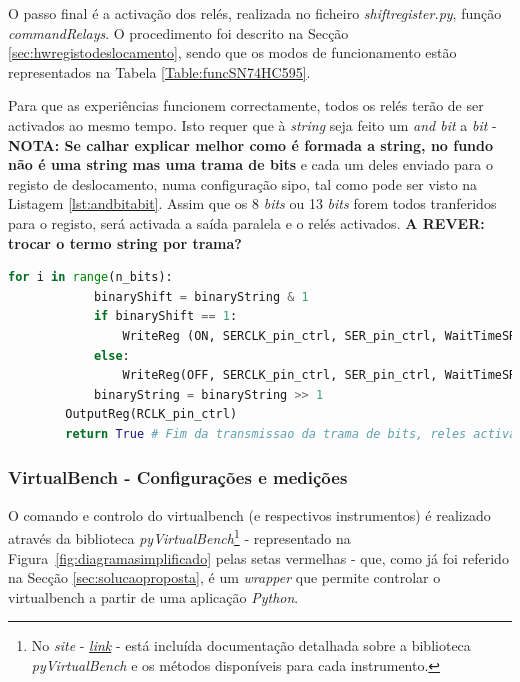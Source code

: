 O passo final é a activação dos relés, realizada no ficheiro \textit{shift\textunderscore register.py}, função \textit{commandRelays}. O procedimento foi descrito na Secção \ref{sec:hwregistodeslocamento}, sendo que os modos de funcionamento estão representados na Tabela \ref{Table:funcSN74HC595}.

Para que as experiências funcionem correctamente, todos os relés terão de ser activados ao mesmo tempo. Isto requer que à \textit{string} seja feito um \textit{and bit} a \textit{bit} - \textbf{NOTA: Se calhar explicar melhor como é formada a string, no fundo não é uma string mas uma trama de bits} e cada um deles enviado para o registo de deslocamento, numa configuração \acrshort{sipo}, tal como pode ser visto na Listagem \ref{lst:andbitabit}. Assim que os 8 \textit{bits} ou 13 \textit{bits} forem todos tranferidos para o registo, será activada a saída paralela e o relés activados. \textbf{A REVER: trocar o termo string por trama?} 

\begin{minipage}{0.9\linewidth}
	\begin{lstlisting}[language=Python,escapechar=|, caption=\textit{And bit} \textit{bit shift\textunderscore register - NOME DO FICH}, label=lst:andbitabit]
		for i in range(n_bits):
			binaryShift = binaryString & 1
			if binaryShift == 1:
				WriteReg (ON, SERCLK_pin_ctrl, SER_pin_ctrl, WaitTimeSR)
			else:
				WriteReg(OFF, SERCLK_pin_ctrl, SER_pin_ctrl, WaitTimeSR)
			binaryString = binaryString >> 1
		OutputReg(RCLK_pin_ctrl)
		return True # Fim da transmissao da trama de bits, reles activados
	\end{lstlisting}
\end{minipage}

\subsubsection{VirtualBench - Configurações e medições}
\label{sec:configmedicaoes}
O comando e controlo do \acrshort{virtualbench} (e respectivos instrumentos) é realizado através da biblioteca \textit{pyVirtualBench}\footnote{No \textit{site} - \href{https://pymeasure.readthedocs.io/en/latest/api/instruments/ni/virtualbench.html}{\textit{link}} - está incluída documentação detalhada sobre a biblioteca \textit{pyVirtualBench} e os métodos disponíveis para cada instrumento.\label{fnlabel}} - representado na Figura~\ref{fig:diagramasimplificado} pelas setas vermelhas - que, como já foi referido na Secção \ref{sec:solucaoproposta}, é um \textit{wrapper} que permite controlar o \acrshort{virtualbench} a partir de uma aplicação \textit{Python}.

